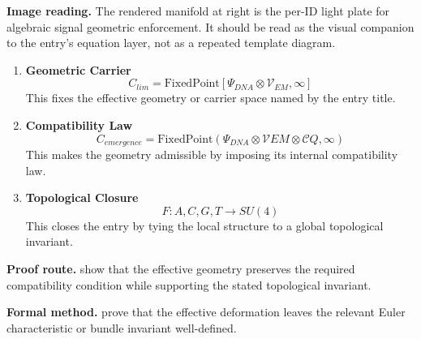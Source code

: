 \begin{samepage}
\noindent\begin{minipage}[t]{0.45\linewidth}
\vspace{0pt}
\raggedright
\scriptsize\textbf{Image reading.} The rendered manifold at right is the per-ID light plate for algebraic signal geometric enforcement. It should be read as the visual companion to the entry's equation layer, not as a repeated template diagram.\par
\end{minipage}\hfill
\begin{minipage}[t]{0.53\linewidth}
\vspace*{-0.10in}
\raggedright
{}
\end{minipage}
\end{samepage}

\clearpage


\begin{enumerate}[leftmargin=1.6em,itemsep=9pt,topsep=6pt]
\item \textbf{Geometric Carrier}
\[
C_{lim} = \text{FixedPoint}[\Psi_{DNA} \otimes \mathcal{V}_{EM}, \infty]
\]
This fixes the effective geometry or carrier space named by the entry title.

\item \textbf{Compatibility Law}
\[
C_{emergence} = \text{FixedPoint}(\Psi_{DNA} \otimes \mathcal{V} {EM} \otimes \mathcal{C} {Q}, \infty)
\]
This makes the geometry admissible by imposing its internal compatibility law.

\item \textbf{Topological Closure}
\[
F: {A, C, G, T} \rightarrow SU(4)
\]
This closes the entry by tying the local structure to a global topological invariant.
\end{enumerate}

\textbf{Proof route.} show that the effective geometry preserves the required compatibility condition while supporting the stated topological invariant.

\textbf{Formal method.} prove that the effective deformation leaves the relevant Euler characteristic or bundle invariant well-defined.

\medskip
{}

